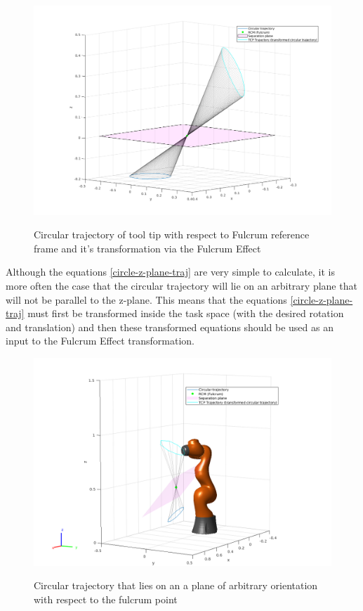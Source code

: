 \begin{center}
\begin{figure}[!htb]
\centering
\includegraphics[width=\textwidth]{images/rcm_trajectories/rcm_circle_traj.png}\\
\caption{Circular trajectory of tool tip with respect to Fulcrum reference frame and it's transformation via the Fulcrum Effect}
\end{figure}
\end{center}

Although the equations \ref{circle-z-plane-traj} are very simple to calculate, it is more often the case that the circular trajectory will lie on an arbitrary plane that will not be parallel to the z-plane. This means 
that the equations \ref{circle-z-plane-traj} must first be transformed inside the task space (with the desired rotation and translation) and then these transformed equations should be used as an input to the 
Fulcrum Effect transformation.

\begin{center}
\begin{figure}[!htb]
\centering
\includegraphics[width=\textwidth]{images/rcm_trajectories/robot-pose-random-rcm-circle-traj.png}\\
\caption{Circular trajectory that lies on an a plane of arbitrary orientation with respect to the fulcrum point}
\end{figure}
\end{center}


